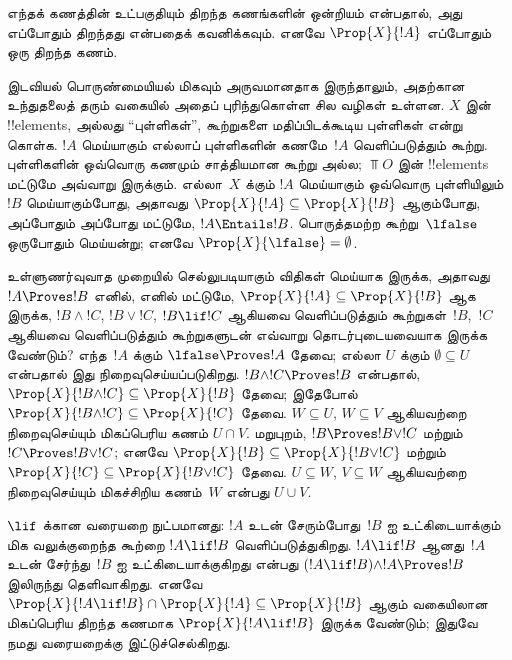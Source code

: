 \documentclass[../../../include/open-logic-section]{subfiles}
\begin{document}
எந்தக் கணத்தின் உட்பகுதியும் திறந்த கணங்களின் ஒன்றியம் என்பதால், அது எப்போதும்
திறந்தது என்பதைக் கவனிக்கவும். எனவே $\Prop{X}{!A}$ எப்போதும் ஒரு திறந்த கணம்.

இடவியல் பொருண்மையியல் மிகவும் அருவமானதாக இருந்தாலும், அதற்கான உந்துதலைத் தரும்
வகையில் அதைப் புரிந்துகொள்ள சில வழிகள் உள்ளன. $X$ இன் !!{element}s, அல்லது
``புள்ளிகள்'', கூற்றுகளை மதிப்பிடக்கூடிய புள்ளிகள் என்று கொள்க. $!A$ மெய்யாகும்
எல்லாப் புள்ளிகளின் கணமே~$!A$ வெளிப்படுத்தும் கூற்று. புள்ளிகளின் ஒவ்வொரு
கணமும் சாத்தியமான கூற்று அல்ல; $\Top{O}$ இன் !!{element}s மட்டுமே அவ்வாறு
இருக்கும். எல்லா~$X$ க்கும் $!A$ மெய்யாகும் ஒவ்வொரு புள்ளியிலும்~$!B$
மெய்யாகும்போது, அதாவது $\Prop{X}{!A} \subseteq \Prop{X}{!B}$ ஆகும்போது,
அப்போதும் அப்போது மட்டுமே, $!A \Entails !B$. பொருத்தமற்ற கூற்று~$\lfalse$
ஒருபோதும் மெய்யன்று; எனவே $\Prop{X}{\lfalse} = \emptyset$.

உள்ளுணர்வுவாத முறையில் செல்லுபடியாகும் விதிகள் மெய்யாக இருக்க, அதாவது
$!A \Proves !B$ எனில், எனில் மட்டுமே, $\Prop{X}{!A} \subseteq
\Prop{X}{!B}$ ஆக இருக்க, $!B \land !C$, $!B \lor !C$, $!B \lif !C$
ஆகியவை வெளிப்படுத்தும் கூற்றுகள்~$!B$,~$!C$ ஆகியவை வெளிப்படுத்தும்
கூற்றுகளுடன் எவ்வாறு தொடர்புடையவையாக இருக்க வேண்டும்? எந்த~$!A$ க்கும்
$\lfalse \Proves !A$ தேவை; எல்லா $U$ க்கும் $\emptyset \subseteq U$
என்பதால் இது நிறைவுசெய்யப்படுகிறது. $!B \land !C \Proves !B$ என்பதால்,
$\Prop{X}{!B \land !C} \subseteq \Prop{X}{!B}$ தேவை; இதேபோல்
$\Prop{X}{!B \land !C} \subseteq \Prop{X}{!C}$ தேவை. $W \subseteq U$,
$W \subseteq V$ ஆகியவற்றை நிறைவுசெய்யும் மிகப்பெரிய கணம் $U \cap V$.
மறுபுறம், $!B \Proves !B \lor !C$ மற்றும் $!C \Proves !B \lor !C$;
எனவே $\Prop{X}{!B} \subseteq \Prop{X}{!B \lor !C}$ மற்றும்
$\Prop{X}{!C} \subseteq \Prop{X}{!B \lor !C}$ தேவை. $U \subseteq W$,
$V \subseteq W$ ஆகியவற்றை நிறைவுசெய்யும் மிகச்சிறிய கணம்~$W$ என்பது
$U \cup V$.

$\lif$ க்கான வரையறை நுட்பமானது: $!A$ உடன் சேரும்போது~$!B$ ஐ
உட்கிடையாக்கும் மிக வலுக்குறைந்த கூற்றை $!A \lif !B$ வெளிப்படுத்துகிறது.
$!A \lif !B$ ஆனது~$!A$ உடன் சேர்ந்து~$!B$ ஐ உட்கிடையாக்குகிறது என்பது
$(!A \lif !B) \land !A \Proves !B $ இலிருந்து தெளிவாகிறது. எனவே
$\Prop{X}{!A \lif !B} \cap \Prop{X}{!A} \subseteq \Prop{X}{!B}$ ஆகும்
வகையிலான மிகப்பெரிய திறந்த கணமாக $\Prop{X}{!A \lif !B}$ இருக்க வேண்டும்;
இதுவே நமது வரையறைக்கு இட்டுச்செல்கிறது.
\end{document}

